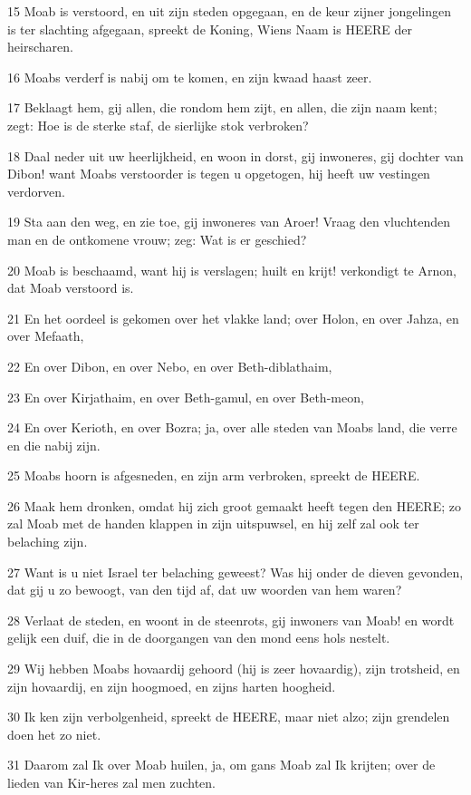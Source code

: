 \par 15 Moab is verstoord, en uit zijn steden opgegaan, en de keur zijner jongelingen is ter slachting afgegaan, spreekt de Koning, Wiens Naam is HEERE der heirscharen.
\par 16 Moabs verderf is nabij om te komen, en zijn kwaad haast zeer.
\par 17 Beklaagt hem, gij allen, die rondom hem zijt, en allen, die zijn naam kent; zegt: Hoe is de sterke staf, de sierlijke stok verbroken?
\par 18 Daal neder uit uw heerlijkheid, en woon in dorst, gij inwoneres, gij dochter van Dibon! want Moabs verstoorder is tegen u opgetogen, hij heeft uw vestingen verdorven.
\par 19 Sta aan den weg, en zie toe, gij inwoneres van Aroer! Vraag den vluchtenden man en de ontkomene vrouw; zeg: Wat is er geschied?
\par 20 Moab is beschaamd, want hij is verslagen; huilt en krijt! verkondigt te Arnon, dat Moab verstoord is.
\par 21 En het oordeel is gekomen over het vlakke land; over Holon, en over Jahza, en over Mefaath,
\par 22 En over Dibon, en over Nebo, en over Beth-diblathaim,
\par 23 En over Kirjathaim, en over Beth-gamul, en over Beth-meon,
\par 24 En over Kerioth, en over Bozra; ja, over alle steden van Moabs land, die verre en die nabij zijn.
\par 25 Moabs hoorn is afgesneden, en zijn arm verbroken, spreekt de HEERE.
\par 26 Maak hem dronken, omdat hij zich groot gemaakt heeft tegen den HEERE; zo zal Moab met de handen klappen in zijn uitspuwsel, en hij zelf zal ook ter belaching zijn.
\par 27 Want is u niet Israel ter belaching geweest? Was hij onder de dieven gevonden, dat gij u zo bewoogt, van den tijd af, dat uw woorden van hem waren?
\par 28 Verlaat de steden, en woont in de steenrots, gij inwoners van Moab! en wordt gelijk een duif, die in de doorgangen van den mond eens hols nestelt.
\par 29 Wij hebben Moabs hovaardij gehoord (hij is zeer hovaardig), zijn trotsheid, en zijn hovaardij, en zijn hoogmoed, en zijns harten hoogheid.
\par 30 Ik ken zijn verbolgenheid, spreekt de HEERE, maar niet alzo; zijn grendelen doen het zo niet.
\par 31 Daarom zal Ik over Moab huilen, ja, om gans Moab zal Ik krijten; over de lieden van Kir-heres zal men zuchten.
